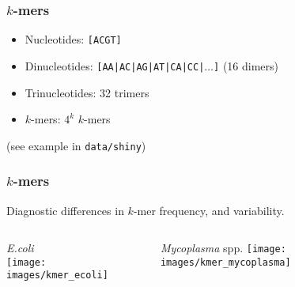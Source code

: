 \begin{frame}
  \frametitle{$k$-mers}
     \begin{itemize}
       \item Nucleotides: \texttt{[ACGT]}
       \item Dinucleotides: \texttt{[AA|AC|AG|AT|CA|CC|$\ldots$]} (16 dimers)
       \item Trinucleotides: 32 trimers
       \item $k$-mers: $4^k$ $k$-mers
     \end{itemize}
     (see example in \texttt{data/shiny})
\end{frame}

\begin{frame}
  \frametitle{$k$-mers}
  Diagnostic differences in $k$-mer frequency, and variability.
  \begin{columns}[T]
    \begin{column}{5cm}
    \textit{E.coli}\\
     \texttt{[image: images/kmer\_ecoli]}\\
    \end{column}
    \begin{column}{5cm}     
     \textit{Mycoplasma} spp.
     \texttt{[image: images/kmer\_mycoplasma]}\\
   \end{column}
  \end{columns}
\end{frame}





